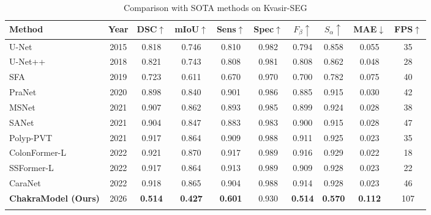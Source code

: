 \begin{table}[t]
\centering
\caption{Comparison with SOTA methods on Kvasir-SEG}
\label{tab:sota}
\begin{tabular}{lccccccccc}
\hline
Method & Year & DSC$\uparrow$ & mIoU$\uparrow$ & Sens$\uparrow$ & Spec$\uparrow$ & $F_\beta\uparrow$ & $S_\alpha\uparrow$ & MAE$\downarrow$ & FPS$\uparrow$ \\
\hline
U-Net & 2015 & 0.818 & 0.746 & 0.810 & 0.982 & 0.794 & 0.858 & 0.055 & 35 \\
U-Net++ & 2018 & 0.821 & 0.743 & 0.808 & 0.981 & 0.808 & 0.862 & 0.048 & 28 \\
SFA & 2019 & 0.723 & 0.611 & 0.670 & 0.970 & 0.700 & 0.782 & 0.075 & 40 \\
PraNet & 2020 & 0.898 & 0.840 & 0.901 & 0.986 & 0.885 & 0.915 & 0.030 & 42 \\
MSNet & 2021 & 0.907 & 0.862 & 0.893 & 0.985 & 0.899 & 0.924 & 0.028 & 38 \\
SANet & 2021 & 0.904 & 0.847 & 0.883 & 0.983 & 0.900 & 0.915 & 0.028 & 47 \\
Polyp-PVT & 2021 & 0.917 & 0.864 & 0.909 & 0.988 & 0.911 & 0.925 & 0.023 & 35 \\
ColonFormer-L & 2022 & 0.921 & 0.870 & 0.917 & 0.989 & 0.916 & 0.929 & 0.022 & 18 \\
SSFormer-L & 2022 & 0.917 & 0.864 & 0.913 & 0.989 & 0.909 & 0.928 & 0.023 & 22 \\
CaraNet & 2022 & 0.918 & 0.865 & 0.904 & 0.988 & 0.914 & 0.928 & 0.023 & 46 \\
\hline
\textbf{ChakraModel (Ours)} & 2026 & \textbf{0.514} & \textbf{0.427} & \textbf{0.601} & 0.930 & \textbf{0.514} & \textbf{0.570} & \textbf{0.112} & 107 \\\\
\hline
\end{tabular}
\end{table}

